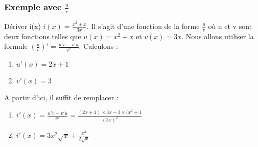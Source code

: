 \documentclass[t]{beamer}
\begin{document}
	\begin{frame}
		\frametitle{Exemple avec $\frac{u}{v}$ }
		\pause
		\begin{block}{Dériver i(x)}
			$i(x) = \frac{x^2 + x}{3x}$. \pause Il s'agit d'une fonction de la forme $\frac{u}{v}$ \pause où u et v sont deux fonctions \pause telles que $u(x) = x^2 + x$ \pause et $v(x) = 3x$. \pause Nous allons utiliser la formule $\left( \frac{u}{v} \right)' = \frac{u'v - v'u}{v^2}$. \pause Calculons :
			\begin{enumerate}{}
				\item<+-> \(u'(x)= 2x + 1 \)
				\item<+-> \(v'(x) = 3 \) 
			\end{enumerate}
			\pause
			A partir d'ici, il suffit de remplacer : \pause
			\begin{enumerate}[]
				\item<+-> \(i'(x) = \frac{u'v - v'u}{v^2} = \frac{(2x+1) \times 3x - 3 \times (x^2+1}{(3x)^2}\) \pause
				\item<+-> \(i'(x) = 3x^2 \sqrt{x} + \frac{x^3}{2 \sqrt{x}} \)
			\end{enumerate}	
		\end{block}
	\end{frame}
\end{document}
